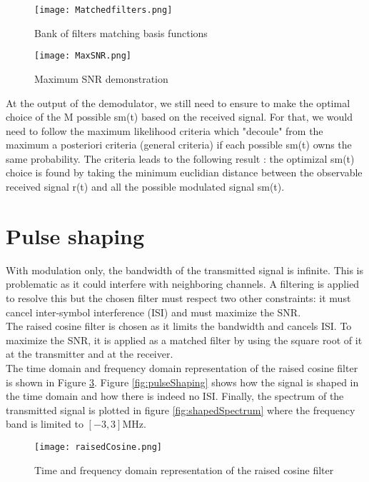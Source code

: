  \begin{figure}[H]
    \centering
    \texttt{[image: Matchedfilters.png]}
    \caption{Bank of filters matching basis functions}
    \label{fig:Matchedfilters}
\end{figure}

\begin{figure}[H]
    \centering
    \texttt{[image: MaxSNR.png]}
    \caption{Maximum SNR demonstration}
    \label{fig:MaxSNR}
\end{figure}

At the output of the demodulator, we still need to ensure to make the optimal choice of the M possible sm(t) based on the received signal.
For that, we would need to follow the maximum likelihood criteria which "decoule" from the maximum a posteriori criteria (general criteria) if each possible sm(t) 
owns the same probability.
The criteria leads to the following result : the optimizal sm(t) choice is found by taking the minimum euclidian distance between the observable received signal r(t) 
and all the possible modulated signal sm(t).

\section{Pulse shaping}

With modulation only, the bandwidth of the transmitted signal is infinite. This is problematic as it could interfere with neighboring channels. A filtering is applied to resolve this but the chosen filter must respect two other constraints: it must cancel inter-symbol interference (ISI) and must maximize the SNR. \\
The raised cosine filter is chosen as it limits the bandwidth and cancels ISI. To maximize the SNR, it is applied as a matched filter by using the square root of it at the transmitter and at the receiver. \\
The time domain and frequency domain representation of the raised cosine filter is shown in Figure \ref{fig:raisedCosine}. Figure \ref{fig:pulseShaping} shows how the signal is shaped in the time domain and how there is indeed no ISI. Finally, the spectrum of the transmitted signal is plotted in figure \ref{fig:shapedSpectrum} where the frequency band is limited to $[-3, 3]$MHz. \\

\begin{figure}[H]
    \centering
    \texttt{[image: raisedCosine.png]}
    \caption{Time and frequency domain representation of the raised cosine filter}
    \label{fig:raisedCosine}
\end{figure}

